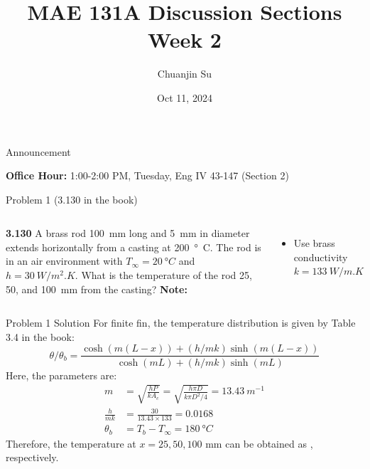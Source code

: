 \documentclass[9pt, aspectratio=169, handout]{beamer}
\title{MAE 131A Discussion Sections\\ Week 2}
\author{Chuanjin Su}
\institute[UCLA MAE]{Mechanical and Aerospace Engineering Department\\
    University of California, Los Angeles}
\date{Oct 11, 2024}
\begin{document}
\begin{frame}
    \titlepage
\end{frame}

\begin{frame}{Announcement}
    \begin{center}
        \textbf{Office Hour:} 1:00-2:00 PM, Tuesday, Eng IV 43-147 (Section 2)
    \end{center}
\end{frame}

\begin{frame}{Problem 1 (3.130 in the book)}
    \begin{columns}
        \textbf{3.130} A brass rod \SI{100}{mm} long and \SI{5}{mm} in diameter extends horizontally from a casting at \SI{200}{\degree C}. The rod is in an air environment with $T_{\infty} = \SI{20}{\degree C}$ and $h=\SI{30}{W/m^2.K}$. What is the temperature of the rod 25, 50, and \SI{100}{mm} from the casting?
        \vspace{2ex}
        \textbf{Note:}
        \begin{itemize}
            \item Use brass conductivity $k = \SI{133}{W/m.K}$
        \end{itemize}
    \end{columns}
\end{frame}

\begin{frame}{Problem 1 Solution}
    For finite fin, the temperature distribution is given by Table 3.4 in the book:
    \begin{equation}
        \theta / \theta_b = \frac{\cosh (m(L-x)) + (h/mk) \sinh (m(L-x))}{\cosh (mL) + (h/mk) \sinh (mL)}
    \end{equation}
    Here, the parameters are:
    \begin{equation*}
        \begin{aligned}
            m &= \sqrt{\frac{hP}{kA_c}} = \sqrt{\frac{h\pi D}{k\pi D^2 / 4}} = \SI{13.43}{m^{-1}} \\
            \frac{h}{mk} &= \frac{30}{13.43\times 133} = 0.0168 \\
            \theta_b &= T_b - T_{\infty} = \SI{180}{\degree C}
        \end{aligned}
    \end{equation*}
    Therefore, the temperature at $x = 25, 50, 100$ \si{mm} can be obtained as , respectively.
\end{frame}
\end{document}
